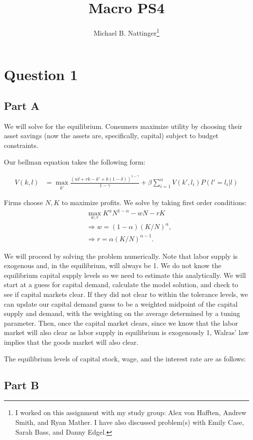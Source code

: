 \documentclass[11pt]{article} %
\title{Macro PS4}
\author{Michael B. Nattinger\footnote{I worked on this assignment with my study group: Alex von Hafften, Andrew Smith, and Ryan Mather. I have also discussed problem(s) with Emily Case, Sarah Bass, and Danny Edgel.}}
\begin{document}
\maketitle
\section{Question 1}
\subsection{Part A}
We will solve for the equilibrium. 
Consumers maximize utility by choosing their asset savings (now the assets are, specifically, capital) subject to budget constraints.

Our bellman equation takes the following form:

\begin{align*}
V(k,l)&= \max_{k'} \frac{(wl + rk - k' + k(1-\delta))^{1-\gamma}}{1-\gamma} + \beta\sum_{i=1}^nV(k',l_i)P(l'=l_i|l)
\end{align*}

Firms choose $N,K$ to maximize profits. We solve by taking first order conditions:
\begin{align*}
&\max_{w,r} K^{\alpha}N^{1-\alpha} - wN - rK\\
&\Rightarrow w = (1-\alpha)(K/N)^{\alpha},\\
&\Rightarrow r = \alpha(K/N)^{\alpha - 1}.
\end{align*}

We will proceed by solving the problem numerically. Note that labor supply is exogenous and, in the equilibrium, will always be 1. We do not know the equilibrium capital supply levels so we need to estimate this analytically. We will start at a guess for capital demand, calculate the model solution, and check to see if capital markets clear. If they did not clear to within the tolerance levels, we can update our capital demand guess to be a weighted midpoint of the capital supply and demand, with the weighting on the average determined by a tuning parameter. Then, once the capital market clears, since we know that the labor market will also clear as labor supply in equilibrium is exogenously 1, Walras' law implies that the goods market will also clear.

The equilibrium levels of capital stock, wage, and the interest rate are as follows:

\begin{center}

\end{center}
\subsection{Part B}
\end{document}
